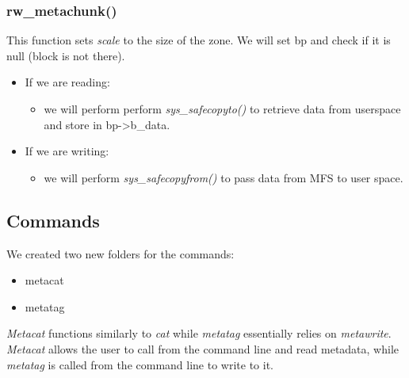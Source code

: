 \documentclass[paper=a4, fontsize=11pt]{scrartcl}
\numberwithin{equation}{section} %
\numberwithin{figure}{section} %
\numberwithin{table}{section} %
\begin{document}
		\subsubsection{rw\_metachunk()}	
		This function sets {\it scale} to the size of the zone. We will set bp and check if it is null (block is not there).
		\begin{itemize}
		\item If we are reading:
			\begin{itemize}
			\item we will perform perform {\it sys\_safecopyto()} to retrieve data from userspace and store in bp->b\_data.
			\end{itemize}
		\item If we are writing:
			\begin{itemize}
			\item we will perform {\it sys\_safecopyfrom()} to pass data from MFS to user space.
			\end{itemize}
		\end{itemize}

\subsection{Commands}
We created two new folders for the commands:
\begin{itemize}
\item metacat
\item metatag
\end{itemize}
{\it Metacat} functions similarly to {\it cat} while {\it metatag} essentially relies on {\it metawrite}. {\it Metacat} allows the user to call from the command line and read metadata, while {\it metatag} is called from the command line to write to it.



\end{document}
